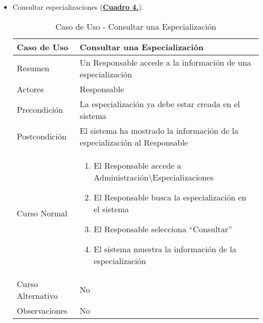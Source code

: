 \begin{itemize}
  \newpage~
	\item \addtocounter{tabla}{1} Consultar especializaciones (\textbf{\hyperref[tab:curConsultarEspec]{Cuadro 4.}}).
		\begin{table}[!htbp]
		  \centering  \addtocounter{casouso}{1}
		  \begin{tabular}{|l | p{100mm}|}
		    \textbf{Caso de Uso}  & \textbf{Consultar una Especialización} \\ \hline
		    Resumen 		 & Un Responsable accede a la información de una especialización \\ \hline
		    Actores  		 & Responsable \\ \hline
		    Precondición  	 & La especialización ya debe estar creada en el sistema  \\ \hline
		    Postcondición  	 & El sistema ha mostrado la información de la especialización al Responsable \\ \hline
		    Curso Normal   	 & \begin{enumerate}
			  \item El Responsable accede a Administración\textbackslash Especializaciones
			  \item El Responsable busca la especialización en el sistema
			  \item El Responsable selecciona ``Consultar''
			  \item El sistema muestra la información de la especialización
		    \end{enumerate}  \\ \hline
		    Curso Alternativo  & No  \\ \hline
		    Observaciones 	 & No  \\ \hline
		  \end{tabular}
		  \caption{Caso de Uso  - Consultar una Especialización}
		  \label{tab:curConsultarEspec}
		\end{table}
		\FloatBarrier


\end{itemize}
